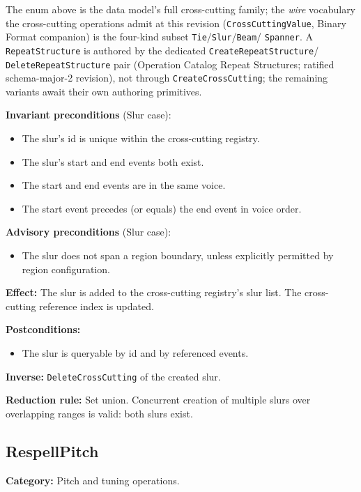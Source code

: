 \documentclass[11pt,letterpaper]{report}
\newcommand{\sectionsc}[1]{{\addfontfeatures{Letters=SmallCaps}#1}}
\begin{document}
The enum above is the data model's full cross-cutting family; the
\emph{wire} vocabulary the cross-cutting operations admit at this
revision (\texttt{CrossCuttingValue}, Binary Format companion) is the
four-kind subset \texttt{Tie}/\texttt{Slur}/\texttt{Beam}/%
\texttt{Spanner}. A \texttt{RepeatStructure} is authored by the
dedicated \texttt{CreateRepeatStructure}/%
\texttt{DeleteRepeatStructure} pair (Operation Catalog
\sectionsc{Repeat Structures}; ratified schema-major-2 revision), not
through \texttt{CreateCrossCutting}; the remaining variants await
their own authoring primitives.

\textbf{Invariant preconditions} (Slur case):
\begin{itemize}
  \item The slur's id is unique within the cross-cutting registry.
  \item The slur's start and end events both exist.
  \item The start and end events are in the same voice.
  \item The start event precedes (or equals) the end event in voice order.
\end{itemize}

\textbf{Advisory preconditions} (Slur case):
\begin{itemize}
  \item The slur does not span a region boundary, unless explicitly
    permitted by region configuration.
\end{itemize}

\textbf{Effect:} The slur is added to the cross-cutting registry's
slur list. The cross-cutting reference index is updated.

\textbf{Postconditions:}
\begin{itemize}
  \item The slur is queryable by id and by referenced events.
\end{itemize}

\textbf{Inverse:} \texttt{DeleteCrossCutting} of the created slur.

\textbf{Reduction rule:} Set union. Concurrent creation of multiple
slurs over overlapping ranges is valid: both slurs exist.

\subsection{RespellPitch}

\textbf{Category:} Pitch and tuning operations.
\end{document}
